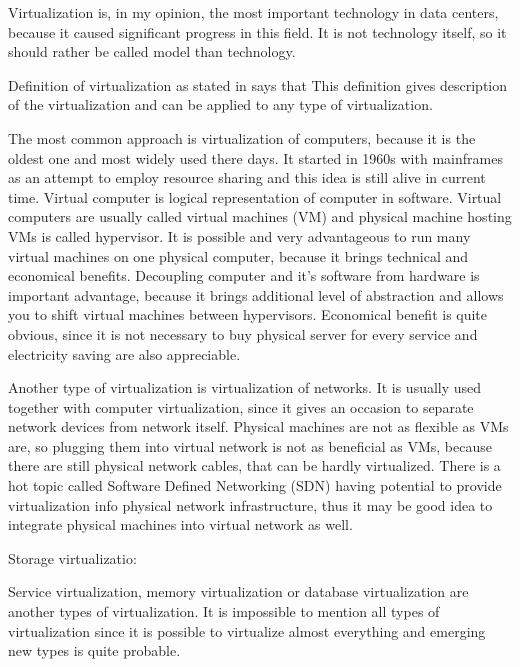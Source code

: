 
Virtualization is, in my opinion, the most important technology in data centers, because it caused significant progress in this field. It is not technology itself, so it should rather be called model than technology.

Definition of virtualization as stated in \cite{virtualization-in-education} says that  This definition gives description of the virtualization and can be applied to any type of virtualization.

The most common approach is virtualization of computers, because it is the oldest one and most widely used there days. It started in 1960s with mainframes as an attempt to employ resource sharing and this idea is still alive in current time. Virtual computer is logical representation of computer in software. \cite{virtualization-in-education} Virtual computers are usually called virtual machines (\Ac{VM}) and physical machine hosting \Ac{VM}s is called hypervisor. It is possible and very advantageous to run many virtual machines on one physical computer, because it brings technical and economical benefits. Decoupling computer and it's software from hardware is important advantage, because it brings additional level of abstraction and allows you to shift virtual machines between hypervisors. Economical benefit is quite obvious, since it is not necessary to buy physical server for every service and electricity saving are also appreciable.

Another type of virtualization is virtualization of networks. It is usually used together with computer virtualization, since it gives an occasion to separate network devices from network itself. Physical machines are not as flexible as \Ac{VM}s are, so plugging them into virtual network is not as beneficial as \Ac{VM}s, because there are still physical network cables, that can be hardly virtualized. There is a hot topic called Software Defined Networking (\Ac{SDN}) having potential to provide virtualization info physical network infrastructure, thus it may be good idea to integrate physical machines into virtual network as well.

Storage virtualizatio:

Service virtualization, memory virtualization or database virtualization are another types of virtualization. It is impossible to mention all types of virtualization since it is possible to virtualize almost everything and emerging new types is quite probable. 


